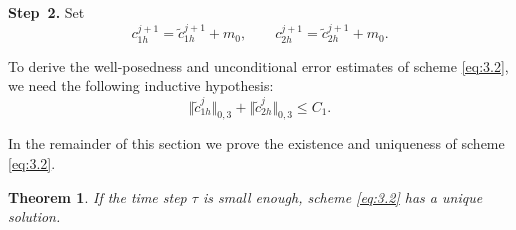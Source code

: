 \documentclass[a4paper,fleqn]{cas-sc}
\numberwithin{equation}{section}
\newtheorem{theorem}{Theorem}[section]
\theoremstyle{definition}
\begin{document}
\noindent\textbf{Step~2.} Set
\begin{equation}
  c^{j+1}_{1h} = \tilde{c}^{j+1}_{1h} + m_{0},
  \qquad
  c^{j+1}_{2h} = \tilde{c}^{j+1}_{2h} + m_{0}.
  \label{eq:3.3}
\end{equation}

To derive the well-posedness and unconditional error estimates of scheme
\eqref{eq:3.2}, we need the following inductive hypothesis:
\begin{equation}
  \bigl\Vert\tilde{c}^{j}_{1h}\bigr\Vert_{0,3}
  + \bigl\Vert\tilde{c}^{j}_{2h}\bigr\Vert_{0,3}
  \le C_{1}.
  \label{eq:3.4}
\end{equation}

In the remainder of this section we prove the existence and uniqueness of
scheme \eqref{eq:3.2}.

\begin{theorem}
  \label{thm:wellposed}
  If the time step $\tau$ is small enough, scheme \eqref{eq:3.2} has a
  unique solution.
\end{theorem}
\end{document}
